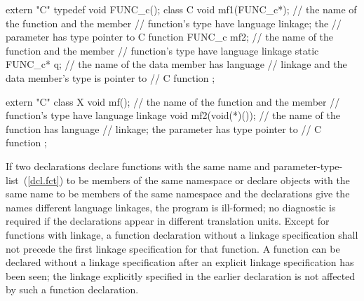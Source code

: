 \begin{example}

\begin{codeblock}
extern "C" typedef void FUNC_c();
class C {
  void mf1(FUNC_c*);            // the name of the function  and the member
                                // function's type have \Cpp language linkage; the
                                // parameter has type pointer to C function
  FUNC_c mf2;                   // the name of the function  and the member
                                // function's type have \Cpp language linkage
  static FUNC_c* q;             // the name of the data member  has \Cpp language
                                // linkage and the data member's type is pointer to
                                // C function
};

extern "C" {
  class X {
    void mf();                  // the name of the function  and the member
                                // function's type have \Cpp language linkage
    void mf2(void(*)());        // the name of the function  has \Cpp language
                                // linkage; the parameter has type pointer to
                                // C function
  };
}
\end{codeblock}
\end{example}

\pnum
If two declarations declare functions with the same name and
parameter-type-list~(\ref{dcl.fct}) to be members of the same
namespace or declare objects with the same name to be members of the same
namespace and the declarations give the names different language linkages, the
program is ill-formed; no diagnostic is required if the declarations appear in
different translation units.
%
Except for functions with \Cpp linkage, a function declaration without a
linkage specification shall not precede the first linkage specification
for that function. A function can be declared without a linkage
specification after an explicit linkage specification has been seen; the
linkage explicitly specified in the earlier declaration is not affected
by such a function declaration.

